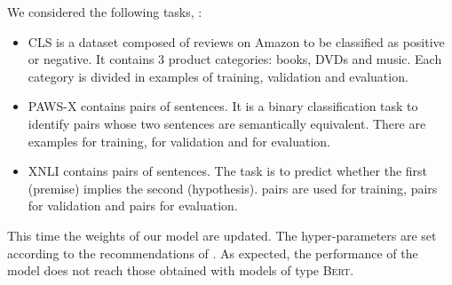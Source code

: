 We considered the following tasks, :
\begin{itemize}
    \item CLS is a dataset composed of reviews on Amazon to be classified as positive or negative. It contains 3 product categories: books, DVDs and music. Each category is divided in  examples of training, validation and evaluation. 
    \item PAWS-X contains pairs of sentences. It is a binary classification task to identify pairs whose two sentences are semantically equivalent. There are  examples for training,  for validation and  for evaluation.
    \item XNLI contains pairs of sentences. The task is to predict whether the first (premise) implies the second (hypothesis).  pairs are used for training,  pairs for validation and  pairs for evaluation.
\end{itemize}

This time the weights of our model are updated. The hyper-parameters are set according to the recommendations of \textcite{le_20b, le_20a}. As expected, the performance of the model does not reach those obtained with models of type \textsc{Bert}. 

\begin{table}[!ht]
\footnotesize
{}
\caption{Accuracy scores for the discriminative tasks of the FLUE benchmark. The symbol $\dagger$ denotes the reported scores of \textcite{le_20a, le_20b}. We indicate the best results in each section in \textbf{bold}, we \underline{underline} the best results overall.}
\end{table}

